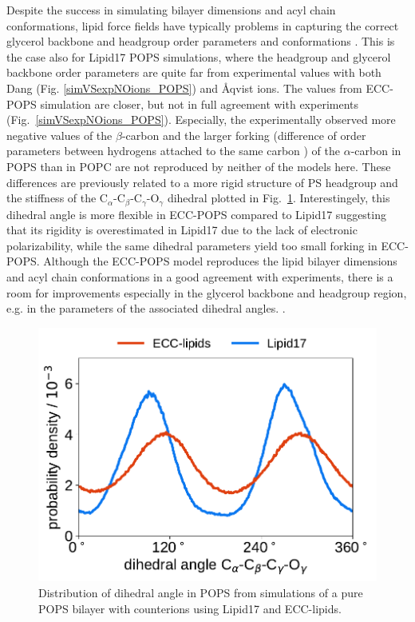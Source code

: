 \documentclass[journal=jpcbfk,manuscript=article]{achemso}
\newlength{\figwidth}
\begin{document}
Despite the success in simulating bilayer dimensions and acyl chain conformations,
lipid force fields have typically problems in capturing the correct glycerol backbone and
headgroup order parameters and conformations \cite{botan15,ollila16,NMRlipidsIV}.
This is the case also for Lipid17 POPS simulations, where the headgroup and glycerol backbone
order parameters are quite far from experimental values with both Dang (Fig. \ref{simVSexpNOions_POPS})
and {\AA}qvist \cite{NMRlipidsIV} ions. The values from ECC-POPS simulation are closer,
but not in full agreement with experiments (Fig.~\ref{simVSexpNOions_POPS}).
Especially, the experimentally observed more negative values of the $\beta$-carbon
and the larger forking (difference of order parameters between hydrogens attached to the
same carbon \cite{ollila16}) of the $\alpha$-carbon in POPS than in POPC \cite{NMRlipidsIV}
are not reproduced by neither of the models here. 
These differences are previously related
to a more rigid structure of PS headgroup and 
the stiffness of the C$_\alpha$-C$_\beta$-C$_\gamma$-O$_\gamma$ dihedral
plotted in Fig.~\ref{fig:dihedral}. 
Interestingely, this dihedral angle is more flexible in ECC-POPS compared to Lipid17 
suggesting that its rigidity is overestimated in Lipid17 due to the lack of electronic polarizability,
while the same dihedral parameters yield too small forking in ECC-POPS.
Although the ECC-POPS model reproduces the lipid bilayer dimensions and
acyl chain conformations in a good agreement with experiments, 
there is a room for improvements especially in the glycerol backbone and headgroup region,
e.g. in the parameters of the associated dihedral angles. 
\cite{botan15, ollila16, Pluhackova2016, NMRlipidsIV}.

\begin{figure}[tbp!] 
  \centering 
  \includegraphics[width=\figwidth]{../img/dihedral_angle_distribution_Ca-Cb-Cg-Og_ECC-L17.pdf}
  \caption{\label{fig:dihedral}
    Distribution of dihedral angle  in POPS 
    from simulations of a pure POPS bilayer with  counterions using Lipid17 and ECC-lipids. 
}
\end{figure} 
\end{document}
